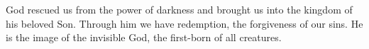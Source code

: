 
\lettrine{G}{}od rescued us from the power of darkness and brought us into the kingdom of his beloved Son. Through him we have redemption, the forgiveness of our sins. He is the image of the invisible God, the first-born of all creatures.